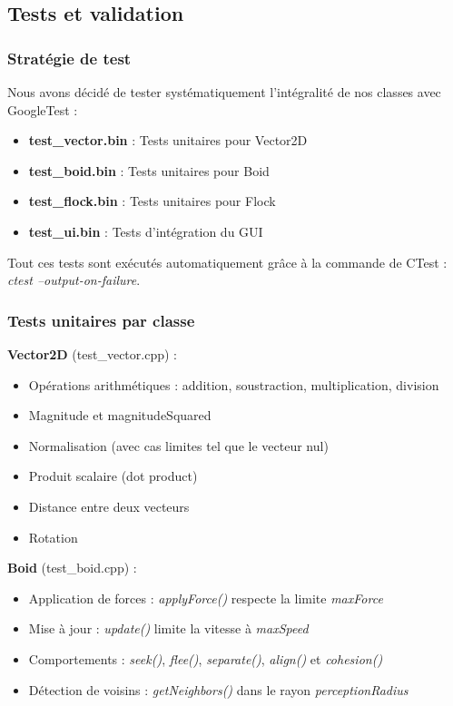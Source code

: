 \documentclass[11pt,a4paper]{article}
\begin{document}
\subsection{Tests et validation}

\subsubsection{Stratégie de test}
Nous avons décidé de tester systématiquement l'intégralité de nos classes avec GoogleTest :

\begin{itemize}
    \item \textbf{test\_vector.bin} : Tests unitaires pour Vector2D
    \item \textbf{test\_boid.bin} : Tests unitaires pour Boid
    \item \textbf{test\_flock.bin} : Tests unitaires pour Flock
    \item \textbf{test\_ui.bin} : Tests d'intégration du GUI
\end{itemize}

Tout ces tests sont exécutés automatiquement grâce à la commande de CTest : \textit{ctest --output-on-failure}.

\subsubsection{Tests unitaires par classe}

\textbf{Vector2D} (test\_vector.cpp) : 
\begin{itemize}
    \item Opérations arithmétiques : addition, soustraction, multiplication, division
    \item Magnitude et magnitudeSquared
    \item Normalisation (avec cas limites tel que le vecteur nul)
    \item Produit scalaire (dot product)
    \item Distance entre deux vecteurs
    \item Rotation
\end{itemize}

\textbf{Boid} (test\_boid.cpp) :
\begin{itemize}
    \item Application de forces : \textit{applyForce()} respecte la limite \textit{maxForce}
    \item Mise à jour : \textit{update()} limite la vitesse à \textit{maxSpeed}
    \item Comportements : \textit{seek()}, \textit{flee()}, \textit{separate()}, \textit{align()} et \textit{cohesion()}
    \item Détection de voisins : \textit{getNeighbors()} dans le rayon \textit{perceptionRadius}
\end{itemize}
\end{document}
